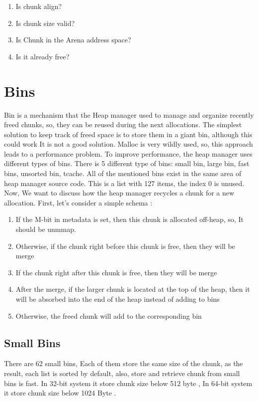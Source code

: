 \documentclass{masterthesis}
\newcommand*\fb{fast bins}
\begin{document}
\begin{enumerate}
	\item Is chunk align? 
	\item Is chunk size valid?
	\item Is Chunk in the Arena address space?
	\item Is it already free?
\end{enumerate}

\section{Bins}
	Bin is a mechanism that the Heap manager used to manage and organize recently freed chunks, so, they can be reused during the next allocations. The simplest solution to keep track of freed space is to store them in a giant bin, although this could work It is not a good solution. Malloc is very wildly used, so, this approach leads to a performance problem.
To improve performance, the heap manager uses different types of bins. There is 5 different type of bins: small bin, large bin, \fb{}, unsorted bin, tcache. All of the mentioned bins exist in the same area of heap manager source code. This is a list with 127 items, the index 0 is unused. 
Now, We want to discuss how the heap manager recycles a chunk for a new allocation. First, let's consider a simple schema :
\begin{enumerate}
	\item If the M-bit in metadata is set, then this chunk is allocated off-heap, so, It should be unmmap.
	\item Otherwise, if the chunk right before this chunk is free, then they will be merge
	\item If the chunk right after this chunk is free, then they will be merge
	\item After the merge, if the larger chunk is located at the top of the heap, then it will be absorbed into the end of the heap instead of adding to bins
	\item Otherwise, the freed chunk will add to the corresponding bin
\end{enumerate}

\subsection{Small Bins}
There are 62 small bins, Each of them store the same size of the chunk, as the result, each list is sorted by default, also, store and retrieve chunk from small bins is fast. In 32-bit system it store chunk size below 512 byte , In 64-bit system it store chunk size below 1024 Byte . 
\end{document}
